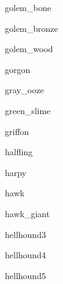 \documentclass[letterpaper,serif]{module}
\begin{document}
\begin{newmonster}{golem_bone}\end{newmonster}

\begin{newmonster}{golem_bronze}\end{newmonster}

\begin{newmonster}{golem_wood}\end{newmonster}

\begin{newmonster}{gorgon}\end{newmonster}

\begin{newmonster}{gray_ooze}\end{newmonster}

\begin{newmonster}{green_slime}\end{newmonster}

\begin{newmonster}{griffon}\end{newmonster}

\begin{newmonster}{halfling}\end{newmonster}

\begin{newmonster}{harpy}\end{newmonster}

\begin{newmonster}{hawk}\end{newmonster}

\begin{newmonster}{hawk_giant}\end{newmonster}

\begin{newmonster}{hellhound3}\end{newmonster}

\begin{newmonster}{hellhound4}\end{newmonster}

\begin{newmonster}{hellhound5}\end{newmonster}
\end{document}
